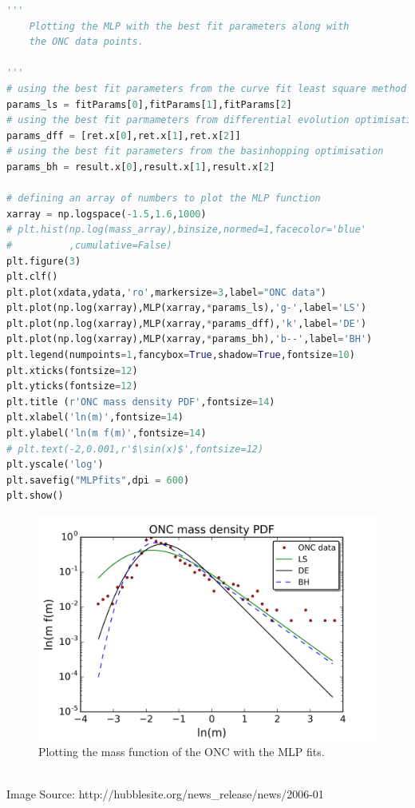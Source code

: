 \documentclass{article}
\begin{document}
\begin{lstlisting}[language=Python, caption=Python example]
'''
    Plotting the MLP with the best fit parameters along with
    the ONC data points.

''' 
# using the best fit parameters from the curve fit least square method
params_ls = fitParams[0],fitParams[1],fitParams[2]
# using the best fit parmameters from differential evolution optimisation
params_dff = [ret.x[0],ret.x[1],ret.x[2]]
# using the best fit parameters from the basinhopping optimisation
params_bh = result.x[0],result.x[1],result.x[2]

# defining an array of numbers to plot the MLP function
xarray = np.logspace(-1.5,1.6,1000)
# plt.hist(np.log(mass_array),binsize,normed=1,facecolor='blue'
#          ,cumulative=False) 
plt.figure(3)
plt.clf()
plt.plot(xdata,ydata,'ro',markersize=3,label="ONC data")
plt.plot(np.log(xarray),MLP(xarray,*params_ls),'g-',label='LS')
plt.plot(np.log(xarray),MLP(xarray,*params_dff),'k',label='DE')
plt.plot(np.log(xarray),MLP(xarray,*params_bh),'b--',label='BH')        
plt.legend(numpoints=1,fancybox=True,shadow=True,fontsize=10)
plt.xticks(fontsize=12)
plt.yticks(fontsize=12)
plt.title (r'ONC mass density PDF',fontsize=14)
plt.xlabel('ln(m)',fontsize=14)
plt.ylabel('ln(m f(m)',fontsize=14)
# plt.text(-2,0.001,r'$\sin(x)$',fontsize=12)
plt.yscale('log')
plt.savefig("MLPfits",dpi = 600)
plt.show()
\end{lstlisting}

     \begin{figure}
	\centering
        \includegraphics[]{MLPfits.png}
	\caption{Plotting the mass function of the ONC with the MLP fits.}
      \end{figure}



{}

 \\Image Source: http://hubblesite.org/news\_release/news/2006-01

%
\end{document}
